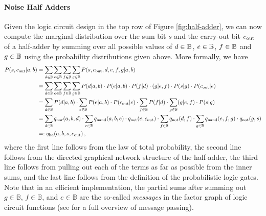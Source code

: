 \paragraph{Noise Half Adders} Given the logic circuit design in the top row of Figure \ref{fig:half-adder}, we can now compute the marginal distribution over the sum bit $s$ and the carry-out bit $c_{\mathrm{out}}$ of a half-adder by summing over all possible values of $d \in \mathbb{B}$, $e \in \mathbb{B}$, $f \in \mathbb{B}$ and $g \in \mathbb{B}$ using the probability distributions given above. More formally, we have
\begin{align}
    P(s,c_{\mathrm{out}}|a,b) & = \sum_{d\in\mathbb{B}} \sum_{e\in\mathbb{B}} \sum_{f\in\mathbb{B}} \sum_{g\in\mathbb{B}} P(s,c_{\mathrm{out}},d,e,f,g|a,b) \nonumber                                                                                              \\
                   & = \sum_{d\in\mathbb{B}} \sum_{e\in\mathbb{B}} \sum_{f\in\mathbb{B}} \sum_{g\in\mathbb{B}} P(d|a,b)\cdot P(e|a,b) \cdot P(f|d) \cdot (g|e,f) \cdot P(s|g) \cdot P(c_{\mathrm{out}}|e) \nonumber                                     \\
                   & = \sum_{d\in\mathbb{B}} P(d|a,b) \cdot \sum_{e\in\mathbb{B}} P(e|a,b) \cdot P(c_{\mathrm{out}}|e) \cdot  \sum_{f\in\mathbb{B}} P(f|d) \cdot \sum_{g\in\mathbb{B}}  (g|e,f) \cdot P(s|g)  \nonumber                                 \\
                   & = \sum_{d\in\mathbb{B}} q_{\mathrm{nor}}(a,b,d) \cdot \sum_{e\in\mathbb{B}} q_{\mathrm{nand}}(a,b,e) \cdot q_{\mathrm{not}}(e,c_{\mathrm{out}}) \cdot \sum_{f\in\mathbb{B}} q_{\mathrm{not}}(d,f) \cdot \sum_{g\in\mathbb{B}}  q_{\mathrm{nand}}(e,f,g) \cdot q_{\mathrm{not}}(g,s)  \nonumber \\
                   & =: q_{\mathrm{ha}}(a,b,s,c_{\mathrm{out}}) \label{eq:noisy_half_adder} \,,
\end{align}
where the first line follows from the law of total probability, the second line follows from the directed graphical network structure of the half-adder, the third line follows from pulling out each of the terms as far as possible from the inner sums, and the last line follows from the definition of the probabilistic logic gates. Note that in an efficient implementation, the partial sums after summing out $g \in \mathbb{B}$, $f \in \mathbb{B}$, and $e \in \mathbb{B}$ are the so-called {\em messages} in the factor graph of logic circuit functions (see \cite{KscFreLoe2001y} for a full overview of message passing).

